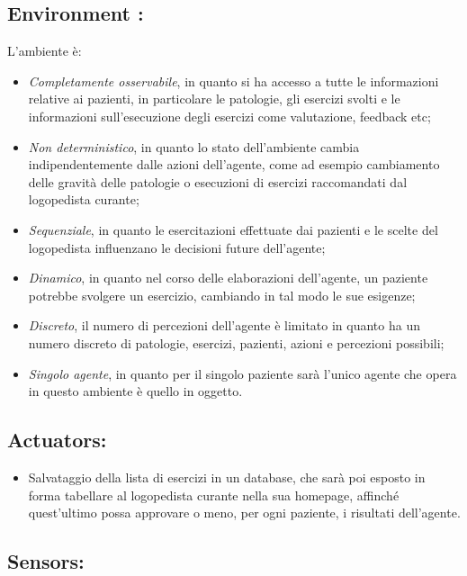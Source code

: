 \documentclass{article}
\begin{document}
    \subsection{Environment :}

    L’ambiente è:

    \begin{itemize}
        \item \textit{Completamente osservabile}, in quanto si ha accesso a tutte le informazioni relative ai pazienti, in particolare le patologie, gli esercizi svolti e le informazioni sull'esecuzione degli esercizi come valutazione, feedback etc;
        \item \textit{Non deterministico}, in quanto lo stato dell’ambiente cambia indipendentemente dalle azioni dell’agente, come ad esempio cambiamento delle gravità delle patologie o esecuzioni di esercizi raccomandati dal logopedista curante;
        \item \textit{Sequenziale}, in quanto le esercitazioni effettuate dai pazienti e le scelte del logopedista influenzano le decisioni future dell’agente;
        \item \textit{Dinamico}, in quanto nel corso delle elaborazioni dell’agente, un paziente potrebbe svolgere un esercizio, cambiando in tal modo le sue esigenze;
        \item \textit{Discreto}, il numero di percezioni dell’agente è limitato in quanto ha un numero discreto di patologie, esercizi, pazienti, azioni e percezioni possibili;
        \item \textit{Singolo agente}, in quanto per il singolo paziente sarà l’unico agente che opera in questo ambiente è quello in oggetto.
    \end{itemize}

    \subsection{Actuators:}

    \begin{itemize}
        \item Salvataggio della lista di esercizi in un database, che sarà poi esposto in forma tabellare  al logopedista curante nella sua homepage, affinché quest'ultimo possa approvare o meno, per ogni paziente, i risultati dell'agente.
    \end{itemize}

    \subsection{Sensors:}
\end{document}
